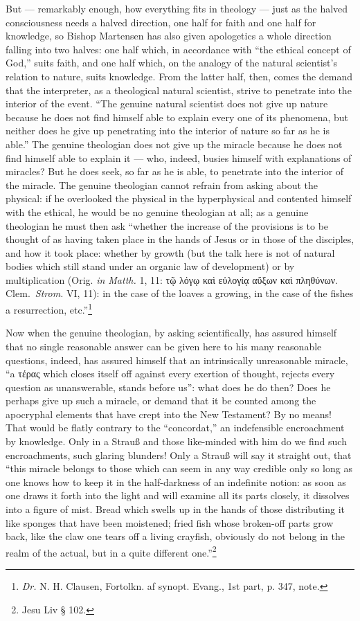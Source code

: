 \documentclass[12pt]{book}
\newcommand{\opage}[1]{\marginnote{\footnotesize\textit{[#1]}}}
\begin{document}
But --- remarkably enough, how everything fits in theology --- just as the halved consciousness needs a halved direction, one half for faith and one half for knowledge, so Bishop Martensen has also given apologetics a whole direction falling into two halves: one half which, in accordance with ``the ethical concept of God,'' suits faith, and one half which, on the analogy of the natural scientist's relation to nature, suits knowledge. From the latter half, then, comes the demand that the interpreter, as a theological natural scientist, strive to penetrate into the interior of the event. ``The genuine natural scientist does not give up nature because he does not find himself able to explain every one of its phenomena, but neither does he give up penetrating into the interior of nature so far as he is able.'' The genuine theologian does not give up the miracle because he does not find himself able to explain it --- who, indeed, busies himself with explanations of miracles? But he does seek, so far as he is able, to penetrate into the interior of the miracle. The genuine theologian cannot refrain from asking about the physical: if he overlooked the physical in the hyperphysical and contented himself with the ethical, he would be no genuine theologian at all; as a genuine theologian he must then ask ``whether the increase of the provisions is to be thought of as having taken place in the hands of Jesus or in those of the disciples, and how it took place: whether by growth (but the talk here is not of natural bodies which still stand under an organic law of development) or by multiplication (Orig. \textit{in Matth.} 1, 11: τῷ λόγῳ καὶ εὐλογίᾳ αὔξων καὶ πληθύνων. Clem.\ \textit{Strom.}
\opage{71}\setcounter{footnote}{0}%
VI, 11): in the case of the loaves a growing, in the case of the fishes a resurrection, etc.''\footnote{\textit{Dr.} N. H. Clausen, Fortolkn. af synopt. Evang., 1st part, p. 347, note.}

Now when the genuine theologian, by asking scientifically, has assured himself that no single reasonable answer can be given here to his many reasonable questions, indeed, has assured himself that an intrinsically unreasonable miracle, ``a τέρας which closes itself off against every exertion of thought, rejects every question as unanswerable, stands before us'': what does he do then? Does he perhaps give up such a miracle, or demand that it be counted among the apocryphal elements that have crept into the New Testament? By no means! That would be flatly contrary to the ``concordat,'' an indefensible encroachment by knowledge. Only in a Strauß and those like-minded with him do we find such encroachments, such glaring blunders! Only a Strauß will say it straight out, that ``this miracle belongs to those which can seem in any way credible only so long as one knows how to keep it in the half-darkness of an indefinite notion: as soon as one draws it forth into the light and will examine all its parts closely, it dissolves into a figure of mist. Bread which swells up in the hands of those distributing it like sponges that have been moistened; fried fish whose broken-off parts grow back, like the claw one tears off a living crayfish, obviously do not belong in the realm of the actual, but in a quite different one.''\footnote{Jesu Liv § 102.}
\end{document}

